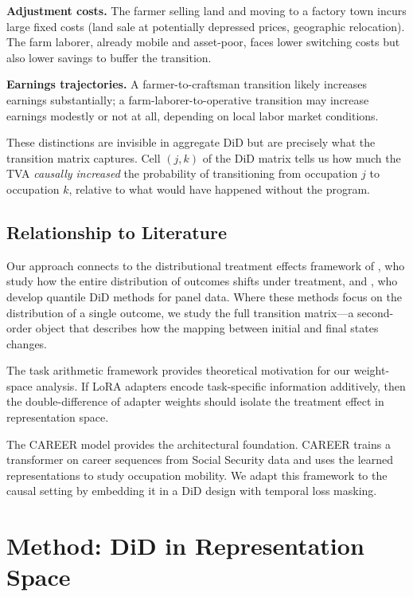 \documentclass[12pt]{article}
\begin{document}
\textbf{Adjustment costs.} The farmer selling land and moving to a factory town incurs large fixed costs (land sale at potentially depressed prices, geographic relocation). The farm laborer, already mobile and asset-poor, faces lower switching costs but also lower savings to buffer the transition.

\textbf{Earnings trajectories.} A farmer-to-craftsman transition likely increases earnings substantially; a farm-laborer-to-operative transition may increase earnings modestly or not at all, depending on local labor market conditions.

These distinctions are invisible in aggregate DiD but are precisely what the transition matrix captures. Cell $(j,k)$ of the DiD matrix tells us how much the TVA \textit{causally increased} the probability of transitioning from occupation $j$ to occupation $k$, relative to what would have happened without the program.

\subsection{Relationship to Literature}

Our approach connects to the distributional treatment effects framework of \citet{athey2006}, who study how the entire distribution of outcomes shifts under treatment, and \citet{callaway2019}, who develop quantile DiD methods for panel data. Where these methods focus on the distribution of a single outcome, we study the full transition matrix---a second-order object that describes how the mapping between initial and final states changes.

The task arithmetic framework \citep{ilharco2023} provides theoretical motivation for our weight-space analysis. If LoRA adapters encode task-specific information additively, then the double-difference of adapter weights should isolate the treatment effect in representation space.

The CAREER model \citep{vafa2022} provides the architectural foundation. CAREER trains a transformer on career sequences from Social Security data and uses the learned representations to study occupation mobility. We adapt this framework to the causal setting by embedding it in a DiD design with temporal loss masking.


\section{Method: DiD in Representation Space}
\label{sec:method}
\end{document}
